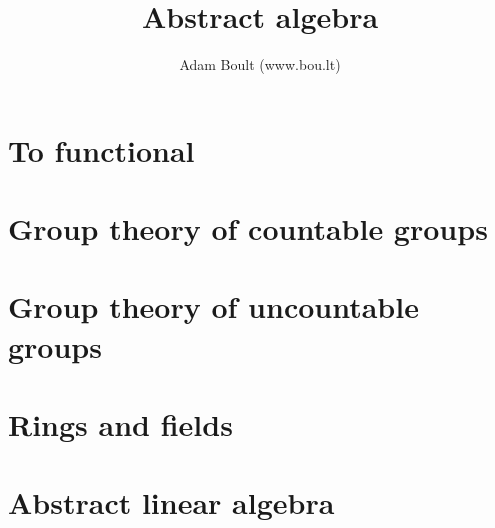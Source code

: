 \documentclass[oneside]{book}
\begin{document}
\author{Adam Boult (www.bou.lt)}
\title{Abstract algebra}
\maketitle

\setcounter{tocdepth}{0}
\tableofcontents



\part{To functional}



\part{Group theory of countable groups}










\part{Group theory of uncountable groups}



\part{Rings and fields}



\part{Abstract linear algebra}









\end{document}
